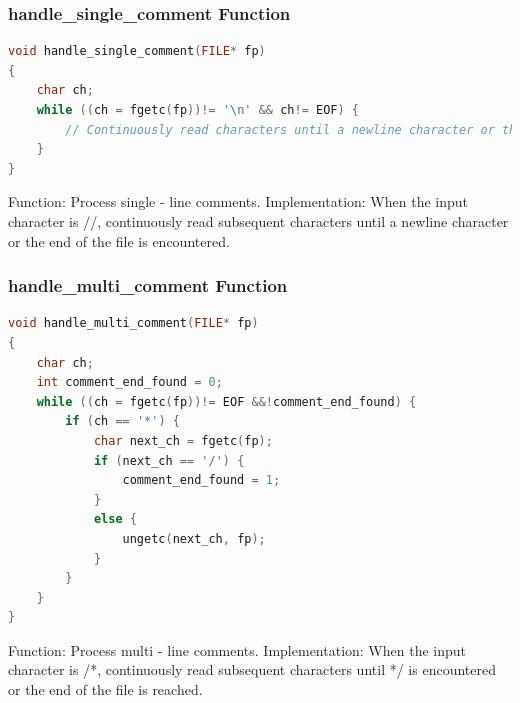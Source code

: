 \documentclass[a4paper,12pt]{article}
\begin{document}
        \subsubsection{handle\_single\_comment Function}
        \begin{lstlisting}[language=c++]
void handle_single_comment(FILE* fp)
{
    char ch;
    while ((ch = fgetc(fp))!= '\n' && ch!= EOF) {
        // Continuously read characters until a newline character or the end of the file is encountered
    }
}
        \end{lstlisting}
        Function: Process single - line comments.
        Implementation: When the input character is //, continuously read subsequent characters until a newline character or the end of the file is encountered.
        
        \subsubsection{handle\_multi\_comment Function}
        \begin{lstlisting}[language=c++]
void handle_multi_comment(FILE* fp)
{
    char ch;
    int comment_end_found = 0;
    while ((ch = fgetc(fp))!= EOF &&!comment_end_found) {
        if (ch == '*') {
            char next_ch = fgetc(fp);
            if (next_ch == '/') {
                comment_end_found = 1;
            }
            else {
                ungetc(next_ch, fp);
            }
        }
    }
}
        \end{lstlisting}
        Function: Process multi - line comments.
        Implementation: When the input character is /*, continuously read subsequent characters until */ is encountered or the end of the file is reached.
        
\end{document}
